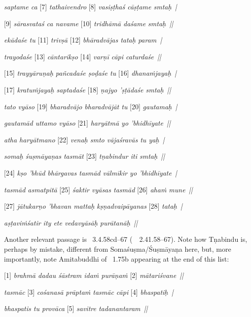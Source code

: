 {{  \textit{saptame ca }[7]\textit{ tathaivendro }[8]\textit{ vasiṣṭhaś cāṣṭame smtaḥ~| } 
 
  [9]\textit{ sārasvataś ca navame }[10]\textit{ tridhāmā daśame smtaḥ~|| } 
 
  \textit{ekādaśe tu }[11]\textit{ trivṣā }[12]\textit{ bhāradvājas tataḥ param~| } 
 
  \textit{trayodaśe }[13]\textit{ cāntarikṣo }[14]\textit{ varṇī cāpi caturdaśe~|| } 
 
  [15]\textit{ trayyāruṇaḥ pañcadaśe ṣoḍaśe tu }[16]\textit{ dhana\.mjayaḥ~| } 
 
  [17]\textit{ kratu\.mjayaḥ saptadaśe }[18]\textit{ ṇajyo 'ṣṭādaśe smtaḥ~|| } 
 
  \textit{tato vyāso }[19]\textit{ bharadvājo bharadvājāt tu }[20]\textit{ gautamaḥ~| } 
 
  \textit{gautamād uttamo vyāso }[21]\textit{ haryātmā yo 'bhidhīyate~|| } 
 
  \textit{atha haryātmano }[22]\textit{ venaḥ smto vājaśravās tu yaḥ~| } 
 
  \textit{somaḥ śuṣmāyaṇas tasmāt }[23]\textit{ tṇabindur iti smtaḥ~|| } 
 
  [24]\textit{ kṣo 'bhūd bhārgavas tasmād vālmīkir yo 'bhidhīyate~| } 
 
  \textit{tasmād asmatpitā }[25]\textit{ śaktir vyāsas tasmād }[26]\textit{ aha\.m mune~|| } 
 
  [27]\textit{ jātukarṇo 'bhavan mattaḥ kṣṇadvaipāyanas }[28]\textit{ tataḥ~| } 
 
  \textit{aṣṭavi\.mśatir ity ete vedavyāsāḥ purātanāḥ~|| }
 
  
 
  Another relevant passage is \BrahmandaPur\ 3.4.58cd--67 {\rm (}\similar\ \VAYUP\ 2.41.58--67{\rm )}.
  Note how Tṇabindu is, perhaps by mistake, different from Somaśuṣma/Śuṣmāyaṇa here,
  but, more importantly, note Amitabuddhi of \VSS\ 1.75b appearing at the end of this list:
  
 
  [1] \textit{brahmā dadau śāstram ida\.m purāṇa\.m }[2]\textit{ mātariśvane~|| } 
 
  \textit{tasmāc }[3]\textit{ cośanasā prāpta\.m tasmāc cāpi }[4]\textit{ bhaspatiḥ~| } 
 
  \textit{bhaspatis tu provāca }[5]\textit{ savitre tadanantaram~|| } 
 
}}
